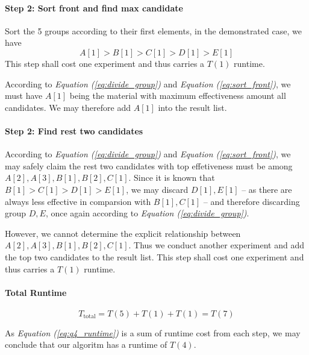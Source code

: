 \documentclass[11pt]{article}
\begin{document}
\paragraph{Step 2: Sort front and find max candidate\newline}
Sort the 5 groups according to their first elements, in the demonstrated case, we have
\begin{equation}
    A[1] > B[1] > C[1] > D[1] > E[1] \label{eq:sort_front}
\end{equation}
This step shall cost one experiment and thus carries a $T(1)$ runtime.


According to \textit{Equation (\ref{eq:divide_group})} and \textit{Equation (\ref{eq:sort_front})}, we must have $A[1]$ being the material with maximum effectiveness amount all candidates. We may therefore add $A[1]$ into the result list.


\paragraph{Step 2: Find rest two candidates\newline}

According to \textit{Equation (\ref{eq:divide_group})} and \textit{Equation (\ref{eq:sort_front})}, we may safely claim the rest two candidates with top effetiveness must be among $A[2], A[3], B[1], B[2], C[1]$. Since it is known that $B[1] > C[1] > D[1] > E[1]$, we may discard $D[1], E[1]$ -- as there are always less effective in comparsion with $B[1], C[1]$ -- and therefore discarding group $D, E$, once again according to \textit{Equation (\ref{eq:divide_group})}.

However, we cannot determine the explicit relationship between  $A[2], A[3], B[1], B[2], C[1]$. Thus we conduct another experiment and add the top two candidates to the result list. This step shall cost one experiment and thus carries a $T(1)$ runtime.


\paragraph{Total Runtime}

\begin{equation}
    T_{\text{total}} = T(5) + T(1) + T(1) = T(7) \label{eq:q4_runtime}
\end{equation}

As \textit{Equation (\ref{eq:q4_runtime})} is a sum of runtime cost from each step, we may conclude that our algoritm has a runtime of $T(4)$.
\end{document}
